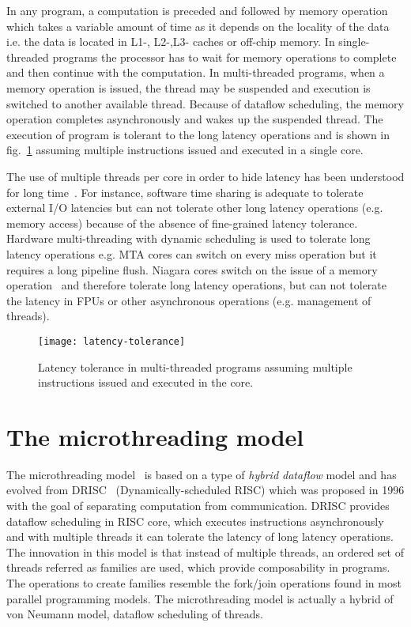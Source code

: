 \documentclass{article}
\begin{document}
In any program, a computation is preceded and followed by memory operation
which takes a variable amount of time as it depends on the locality of the data
i.e. the data is located in L1-, L2-,L3- caches or off-chip memory. In
single-threaded programs the processor has to wait for memory operations to
complete and then continue with the computation. In multi-threaded programs,
when a memory operation is issued, the thread may be suspended and execution is
switched to another available thread. Because of dataflow scheduling, the
memory operation completes asynchronously and wakes up the suspended thread.
The execution of program is tolerant to the long latency operations and is
shown in fig.~\ref{fig:latency_tolerance} assuming multiple instructions issued
and executed in a single core.

The use of multiple threads per core in order to hide latency has been
understood for long time~\cite{Weber:1989:EBM:74926.74956}. For instance,
software time sharing is adequate to tolerate external I/O latencies but can
not tolerate other long latency operations (e.g. memory access) because of the
absence of fine-grained latency tolerance. Hardware multi-threading with
dynamic scheduling is used to tolerate long latency operations e.g. MTA cores
can switch on every miss operation but it requires a long pipeline flush.
Niagara cores switch on the issue of a memory operation~\cite{5434030} and
therefore tolerate long latency operations, but can not tolerate the latency in
FPUs or other asynchronous operations (e.g. management of threads).

\begin{figure}
\begin{centering}
    \texttt{[image: latency-tolerance]}
    \caption{\label{fig:latency_tolerance}Latency tolerance in multi-threaded programs assuming multiple
    instructions issued and executed in the core.}
\end{centering}
\end{figure}

\section{The microthreading model}\label{sn:microthreading_model}

The microthreading model~\cite{Jesshope:2000:MNA:784563.784568} is based on a
type of \emph{hybrid dataflow} model and has evolved from
DRISC~\cite{Bolychevsky96dynamicscheduling} (Dynamically-scheduled RISC) which
was proposed in 1996 with the goal of separating computation from
communication. DRISC provides dataflow scheduling in RISC core, which executes
instructions asynchronously and with multiple threads it can tolerate the
latency of long latency operations. The innovation in this model is that
instead of multiple threads, an ordered set of threads referred as families are
used, which provide composability in programs. The operations to create
families resemble the fork/join operations found in most parallel programming
models. The microthreading model is actually a hybrid of von Neumann model,
dataflow scheduling of threads. 
\end{document}
